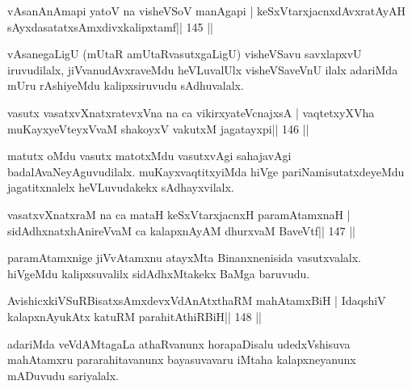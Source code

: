 

\begin{shl}
vAsanAnAmapi yatoV na visheVSoV manAgapi |
keSxVtarxjacnxdAvxratAyAH sAyxdasatatxsAmxdivxkalipxtamf\hfill || 145 ||
\end{shl}

\begin{artha}
vAsanegaLigU (mUtaR amUtaRvasutxgaLigU) visheVSavu savxlapxvU iruvudilalx, jiVvanudAvxraveMdu heVLuvalUlx visheVSaveVnU ilalx adariMda mUru rAshiyeMdu kalipxsiruvudu sAdhuvalalx.
\end{artha}


\begin{shl}
vasutx vasatxvXnatxratevxVna na ca vikirxyateV\s cnajxsA |
vaqtetxyXVha muKayxyeVteyxVvaM shakoyxV vakutxM jagatayxpi\hfill || 146 ||
\end{shl}

\begin{artha}
matutx oMdu vasutx matotxMdu vasutxvAgi sahajavAgi  badalAvaNeyAguvudilalx. muKayxvaqtitxyiMda hiVge pariNamisutatxdeyeMdu jagatitxnalelx heVLuvudakekx sAdhayxvilalx.
\end{artha}

\begin{shl}
vasatxvXnatxraM na ca mataH keSxVtarxjacnxH paramAtamxnaH |
sidAdhxnatxhAnireVvaM ca kalapxnAyAM dhurxvaM BaveVtf\hfill || 147 ||
\end{shl}

\begin{artha}
paramAtamxnige jiVvAtamxnu atayxMta Binanxnenisida vasutxvalalx. hiVgeMdu kalipxsuvalilx sidAdhxMtakekx BaMga baruvudu.
\end{artha}


\begin{shl}
AvishicxkiVSuRBisatxsAmxdevxVdAnAtxthaRM mahAtamxBiH |
IdaqshiV kalapxnA\s yukAtx katuRM parahitAthiRBiH\hfill || 148 ||
\end{shl}

\begin{artha}
adariMda veVdAMtagaLa athaRvanunx horapaDisalu udedxVshisuva mahAtamxru pararahitavanunx bayasuvavaru iMtaha kalapxneyanunx mADuvudu sariyalalx.
\end{artha}

